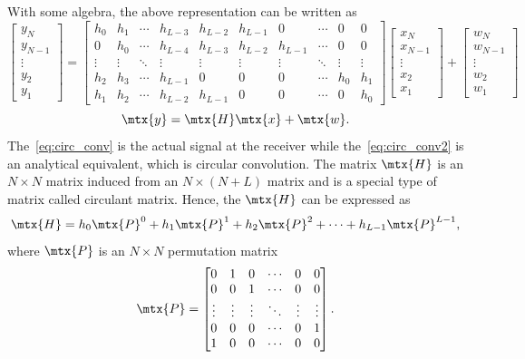 With some algebra, the above representation can be written as
\begin{equation}
    \label{eq:circ_conv2}
    \begin{bmatrix}
        y_{N} \\ y_{N-1} \\ \vdots \\ y_2 \\ y_1
    \end{bmatrix}
    =
    \begin{bmatrix}
        h_0 & h_1 & \cdots & h_{L-3} & h_{L-2} & h_{L-1} & 0 & \cdots & 0 & 0 \\
        0 & h_0 & \cdots & h_{L-4} & h_{L-3} & h_{L-2} & h_{L-1} & \cdots & 0 & 0 \\
        \vdots & \vdots & \ddots & \vdots & \vdots & \vdots & \vdots & \ddots & \vdots & \vdots \\
        h_2 & h_3 & \cdots & h_{L-1} & 0 & 0 & 0 & \cdots & h_0 & h_1 \\
        h_1 & h_2 & \cdots & h_{L-2} & h_{L-1} & 0 & 0 & \cdots & 0 & h_0
    \end{bmatrix}
    \begin{bmatrix}
        x_{N} \\ x_{N-1} \\ \vdots \\ x_2 \\ x_1
    \end{bmatrix}
    +
    \begin{bmatrix}
        w_{N} \\ w_{N-1} \\ \vdots \\ w_2 \\ w_1
    \end{bmatrix}
\end{equation}
\begin{equation}
    \mtx{y} = \mtx{H}\mtx{x} + \mtx{w}.
\end{equation}
The~\cref{eq:circ_conv} is the actual signal at the receiver while the~\cref{eq:circ_conv2} is an analytical equivalent, which is circular convolution. The matrix $\mtx{H}$ is an $N\times N$ matrix induced from an $N\times(N+L)$ matrix and is a special type of matrix called circulant matrix. Hence, the $\mtx{H}$ can be expressed as
\begin{equation}
    \label{eq:circ_mat}
    \mtx{H} = h_0\mtx{P}^0+h_1\mtx{P}^1+h_2\mtx{P}^2+\cdots+h_{L-1}\mtx{P}^{L-1},
\end{equation}
where $\mtx{P}$ is an $N\times N$ permutation matrix
\begin{equation}
    \mtx{P} = \begin{bmatrix}
        0 & 1 & 0 & \cdots & 0 & 0 \\
        0 & 0 & 1 & \cdots & 0 & 0 \\
        \vdots & \vdots & \vdots & \ddots & \vdots & \vdots \\
        0 & 0 & 0 & \cdots & 0 & 1 \\
        1 & 0 & 0 & \cdots & 0 & 0
    \end{bmatrix}.
\end{equation}

